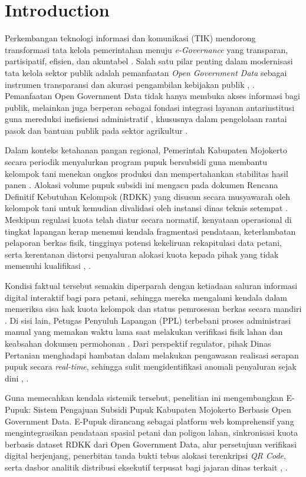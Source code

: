 \documentclass[conference]{IEEEtran}
\begin{document}
\section{Introduction}  
Perkembangan teknologi informasi dan komunikasi (TIK) mendorong transformasi tata kelola pemerintahan menuju \textit{e-Governance} yang transparan, partisipatif, efisien, dan akuntabel \cite{b1}. Salah satu pilar penting dalam modernisasi tata kelola sektor publik adalah pemanfaatan \textit{Open Government Data} sebagai instrumen transparansi dan akurasi pengambilan kebijakan publik \cite{b2}, \cite{b3}. Pemanfaatan Open Government Data tidak hanya membuka akses informasi bagi publik, melainkan juga berperan sebagai fondasi integrasi layanan antarinstitusi guna mereduksi inefisiensi administratif \cite{b3}, khususnya dalam pengelolaan rantai pasok dan bantuan publik pada sektor agrikultur \cite{b6}.

Dalam konteks ketahanan pangan regional, Pemerintah Kabupaten Mojokerto secara periodik menyalurkan program pupuk bersubsidi guna membantu kelompok tani menekan ongkos produksi dan mempertahankan stabilitas hasil panen \cite{b5}. Alokasi volume pupuk subsidi ini mengacu pada dokumen Rencana Definitif Kebutuhan Kelompok (RDKK) yang disusun secara musyawarah oleh kelompok tani untuk kemudian divalidasi oleh instansi dinas teknis setempat \cite{b4}. Meskipun regulasi kuota telah diatur secara normatif, kenyataan operasional di tingkat lapangan kerap menemui kendala fragmentasi pendataan, keterlambatan pelaporan berkas fisik, tingginya potensi kekeliruan rekapitulasi data petani, serta kerentanan distorsi penyaluran alokasi kuota kepada pihak yang tidak memenuhi kualifikasi \cite{b5}, \cite{b7}.

Kondisi faktual tersebut semakin diperparah dengan ketiadaan saluran informasi digital interaktif bagi para petani, sehingga mereka mengalami kendala dalam memeriksa sisa hak kuota kelompok dan status pemrosesan berkas secara mandiri \cite{b7}. Di sisi lain, Petugas Penyuluh Lapangan (PPL) terbebani proses administrasi manual yang memakan waktu lama saat melakukan verifikasi fisik lahan dan keabsahan dokumen permohonan \cite{b6}. Dari perspektif regulator, pihak Dinas Pertanian menghadapi hambatan dalam melakukan pengawasan realisasi serapan pupuk secara \textit{real-time}, sehingga sulit mengidentifikasi anomali penyaluran sejak dini \cite{b3}, \cite{b5}.

Guna memecahkan kendala sistemik tersebut, penelitian ini mengembangkan E-Pupuk: Sistem Pengajuan Subsidi Pupuk Kabupaten Mojokerto Berbasis Open Government Data. E-Pupuk dirancang sebagai platform web komprehensif yang mengintegrasikan pendataan spasial petani dan poligon lahan, sinkronisasi kuota berbasis dataset RDKK dari Open Government Data, alur persetujuan verifikasi digital berjenjang, penerbitan tanda bukti tebus alokasi terenkripsi \textit{QR Code}, serta dasbor analitik distribusi eksekutif terpusat bagi jajaran dinas terkait \cite{b6}, \cite{b7}.
\end{document}
